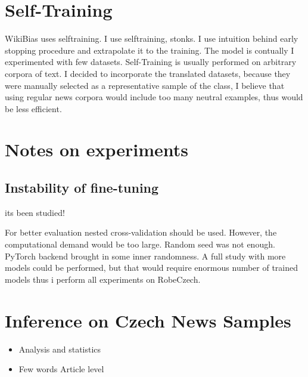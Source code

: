  
 
\section{Self-Training}
WikiBias uses selftraining. I use selftraining, stonks.
I use intuition behind early stopping procedure and extrapolate it to the training. The model is contually 
I experimented with few datasets. Self-Training is usually performed on arbitrary corpora of text. I decided to incorporate the translated datasets, because they were manually selected as a representative sample of the class, I believe that using regular news corpora would include too many neutral examples, thus would be less efficient.





\section{Notes on experiments}
\subsection{Instability of fine-tuning}
its been studied!

For better evaluation nested cross-validation should be used. However, the computational demand would be too large. Random seed was not enough. PyTorch backend brought in some inner randomness.
  A full study with more models could be performed, but that would require enormous number of trained models thus i perform all experiments on RobeCzech.
\section{Inference on Czech News Samples}
\begin{itemize}
    \item Analysis and statistics
    \item Few words Article level
\end{itemize}


